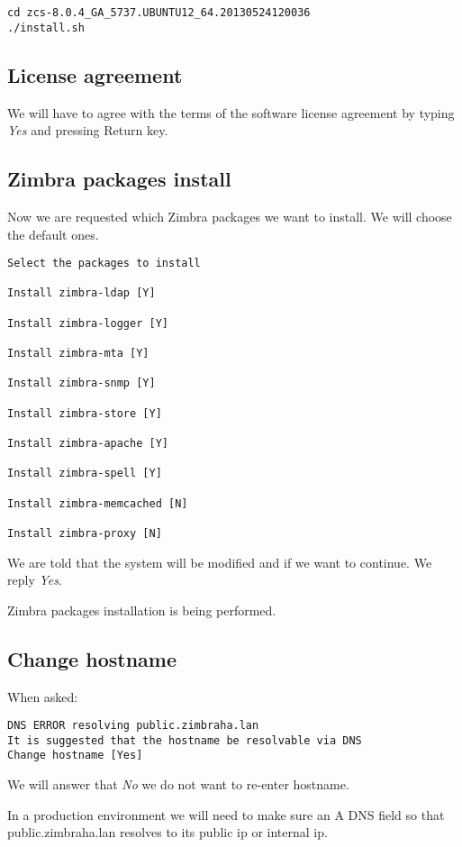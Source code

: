 \begin{verbatim}
cd zcs-8.0.4_GA_5737.UBUNTU12_64.20130524120036
./install.sh
\end{verbatim}
\subsection {License agreement}
We will have to agree with the terms of the software license agreement by typing \textit{Yes} and pressing Return key.

\subsection {\label{subsec:zimbra-packages-install}Zimbra packages install}
Now we are requested which Zimbra packages we want to install. We will choose the default ones.

\begin{verbatim}
Select the packages to install

Install zimbra-ldap [Y] 

Install zimbra-logger [Y] 

Install zimbra-mta [Y] 

Install zimbra-snmp [Y] 

Install zimbra-store [Y] 

Install zimbra-apache [Y] 

Install zimbra-spell [Y] 

Install zimbra-memcached [N] 

Install zimbra-proxy [N] 
\end{verbatim}

We are told that the system will be modified and if we want to continue. We reply \textit{Yes}.

Zimbra packages installation is being performed.

\subsection {Change hostname}
When asked:
\begin{verbatim}
DNS ERROR resolving public.zimbraha.lan
It is suggested that the hostname be resolvable via DNS
Change hostname [Yes]
\end{verbatim}
We will answer that \textit{No} we do not want to re-enter hostname.

In a production environment we will need to make sure an A DNS field so that public.zimbraha.lan resolves to its public ip or internal ip.

